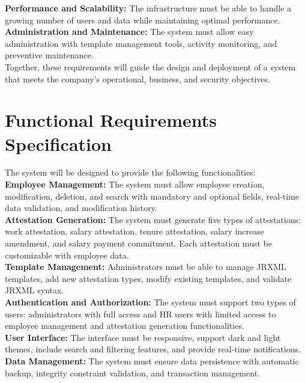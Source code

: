 \documentclass[a4paper,12pt]{report}
\begin{document}
\begin{doublespace}
\textbf{Performance and Scalability:}  
The infrastructure must be able to handle a growing number of users and data while maintaining optimal performance. \\

\textbf{Administration and Maintenance:}  
The system must allow easy administration with template management tools, activity monitoring, and preventive maintenance. \\

Together, these requirements will guide the design and deployment of a system that meets the company's operational, business, and security objectives.
\end{doublespace}

\section{Functional Requirements Specification}
\hspace{1cm}The system will be designed to provide the following functionalities: \\

\textbf{Employee Management:}  
The system must allow employee creation, modification, deletion, and search with mandatory and optional fields, real-time data validation, and modification history. \\

\textbf{Attestation Generation:}  
The system must generate five types of attestations: work attestation, salary attestation, tenure attestation, salary increase amendment, and salary payment commitment. Each attestation must be customizable with employee data. \\

\textbf{Template Management:}  
Administrators must be able to manage JRXML templates, add new attestation types, modify existing templates, and validate JRXML syntax. \\

\textbf{Authentication and Authorization:}  
The system must support two types of users: administrators with full access and HR users with limited access to employee management and attestation generation functionalities. \\

\textbf{User Interface:}  
The interface must be responsive, support dark and light themes, include search and filtering features, and provide real-time notifications. \\

\textbf{Data Management:}  
The system must ensure data persistence with automatic backup, integrity constraint validation, and transaction management. \\
\end{document}
